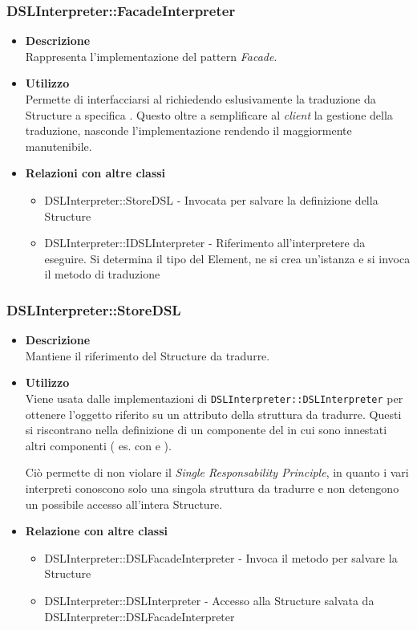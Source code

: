 \subsubsection{DSLInterpreter::FacadeInterpreter}
\begin{itemize}
\item \textbf{Descrizione} \hfill \\
  Rappresenta l'implementazione del pattern \textit{Facade}.
\item \textbf{Utilizzo} \hfill \\
  Permette di interfacciarsi al  richiedendo eslusivamente la traduzione da  Structure a specifica . Questo oltre a semplificare al \textit{client} la gestione della traduzione, nasconde l'implementazione rendendo il  maggiormente manutenibile.
\item \textbf{Relazioni con altre classi} \hfill
  \begin{itemize}
  \item DSLInterpreter::StoreDSL - Invocata per salvare la definizione della  Structure
  \item DSLInterpreter::IDSLInterpreter - Riferimento all'interpretere da eseguire. Si determina il tipo del  Element, ne si crea un'istanza e si invoca il metodo di traduzione
  \end{itemize}
\end{itemize}
\subsubsection{DSLInterpreter::StoreDSL}
\begin{itemize}
\item \textbf{Descrizione} \hfill \\
  Mantiene il riferimento del  Structure da tradurre.
\item \textbf{Utilizzo} \hfill \\
  Viene usata dalle implementazioni di \texttt{DSLInterpreter::DSLInterpreter} per ottenere l'oggetto riferito su un attributo della struttura da tradurre. Questi  si riscontrano nella definizione di un componente del  in cui sono innestati altri componenti ( es.  con  e  ).

  Ciò permette di non violare il \textit{Single Responsability Principle}, in quanto i vari interpreti conoscono solo una singola struttura da tradurre e non detengono un possibile accesso all'intera  Structure.
\item \textbf{Relazione con altre classi} \hfill
  \begin{itemize}
  \item DSLInterpreter::DSLFacadeInterpreter - Invoca il metodo per salvare la  Structure
  \item DSLInterpreter::DSLInterpreter - Accesso alla  Structure salvata da DSLInterpreter::DSLFacadeInterpreter
  \end{itemize}
\end{itemize}
